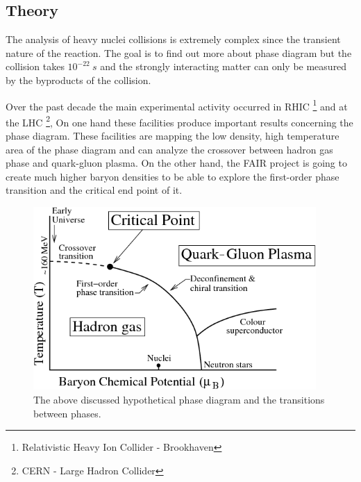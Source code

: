 \documentclass[a4paper,12pt]{article}
\begin{document}
\subsection{ Theory}
\vspace{5mm}
\par The analysis of heavy nuclei collisions is extremely complex since the transient nature
 of the reaction. The goal is to find out more about
 phase diagram but the collision takes $10^{-22}~s$ and the strongly interacting matter
  can only be measured by the byproducts of the collision.
\par Over the past decade the main experimental activity occurred in RHIC \footnote{ Relativistic Heavy Ion Collider - Brookhaven }
 and at the LHC 
\footnote{ CERN - Large Hadron Collider }, On one hand these facilities produce important results concerning the 
phase diagram. These facilities 
are mapping the low density, high temperature area of the phase diagram and can analyze the crossover between hadron
 gas phase and quark-gluon 
plasma. On the other hand, the FAIR project is going to create much higher baryon densities to be able to explore 
the first-order phase transition
and the critical end point of it.
\begin{figure}[H]
	\centering
	\includegraphics[width=0.96\textwidth]{CBM_phase_trans.png}
	\caption{ The above discussed hypothetical phase diagram and the transitions between phases. }
\end{figure}
\end{document}
